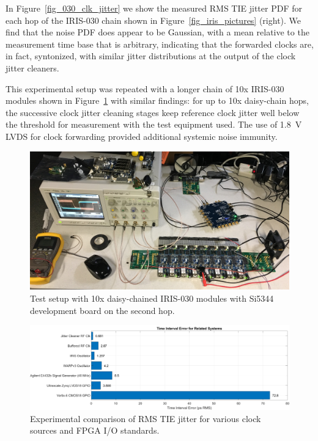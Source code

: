 In Figure~\ref{fig_030_clk_jitter} we show the measured \ac{RMS} \ac{TIE} jitter \ac{PDF} for each hop of the IRIS-030 chain shown in Figure~\ref{fig_iris_pictures} (right).
We find that the noise \ac{PDF} does appear to be Gaussian, with a mean relative to the measurement time base that is arbitrary, indicating that the forwarded clocks are, in fact, syntonized, with similar jitter distributions at the output of the clock jitter cleaners. 

This experimental setup was repeated with a longer chain of 10x IRIS-030 modules shown in Figure~\ref{fig_10x_hop_setup} with similar findings: for up to 10x daisy-chain hops, the successive clock jitter cleaning stages keep reference clock jitter well below the threshold for measurement with the test equipment used.
The use of 1.8~V \ac{LVDS} for clock forwarding provided additional systemic noise immunity.

\begin{figure}[h]
\centering
  \includegraphics[width=1\linewidth]{figs/clk/030_clocking_chain}   
    \caption{Test setup with 10x daisy-chained IRIS-030 modules with Si5344 development board on the second hop.}
\label{fig_10x_hop_setup}
\end{figure}


\begin{figure}[h]
\centering
  \includegraphics[width=1\linewidth]{figs/clk/iris_jitter_common_things}   
    \caption{Experimental comparison of \ac{RMS} \ac{TIE} jitter for various clock sources and \ac{FPGA} I/O standards.}
\label{fig_jitter_comparisons}
\end{figure}

